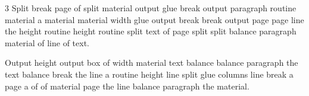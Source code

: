 \documentclass{article}
\begin{document}
\begin{multicols*}{3}
Split break page of split material output glue break output paragraph routine material a material material width glue output break break output page page line the height routine height routine split text of page split split balance paragraph material of line of text.

Output height output box of width material text balance balance paragraph the text balance break the line a routine height line split glue columns line break a page a of of material page the line balance paragraph the material.

\end{multicols*}
\end{document}
